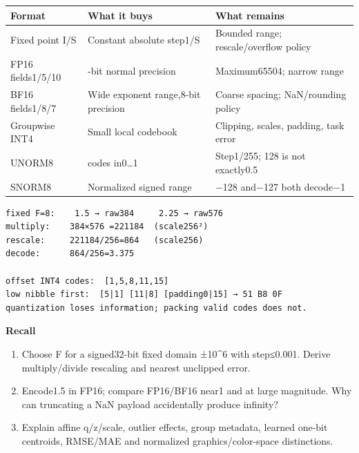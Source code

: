 {\def\LTcaptype{none} %
\begin{longtable}[]{@{}
  >{\raggedright\arraybackslash}p{}
  >{\raggedright\arraybackslash}p{}
  >{\raggedright\arraybackslash}p{}@{}}
\toprule\noalign{}
\begin{minipage}[b]{\linewidth}\raggedright
Format
\end{minipage} & \begin{minipage}[b]{\linewidth}\raggedright
What it buys
\end{minipage} & \begin{minipage}[b]{\linewidth}\raggedright
What remains
\end{minipage} \\
\midrule\noalign{}
\endhead
\bottomrule\noalign{}
\endlastfoot
Fixed point I/S & Constant absolute step1/S & Bounded range; rescale/overflow policy \\
FP16 fields1/5/10 & 11-bit normal precision & Maximum65504; narrow range \\
BF16 fields1/8/7 & Wide exponent range,8-bit precision & Coarse spacing; NaN/rounding policy \\
Groupwise INT4 & Small local codebook & Clipping, scales, padding, task error \\
UNORM8 & 256 codes in0\ldots1 & Step1/255; 128 is not exactly0.5 \\
SNORM8 & Normalized signed range & −128 and−127 both decode−1 \\
\end{longtable}
}

\begin{verbatim}
fixed F=8:    1.5 → raw384     2.25 → raw576
multiply:    384×576 =221184  (scale256²)
rescale:     221184/256=864   (scale256)
decode:      864/256=3.375

offset INT4 codes:  [1,5,8,11,15]
low nibble first:  [5|1] [11|8] [padding0|15] → 51 B8 0F
quantization loses information; packing valid codes does not.
\end{verbatim}

\textbf{Recall}

\begin{enumerate}
\def\labelenumi{\arabic{enumi}.}
\setcounter{enumi}{17}
\tightlist
\item
  Choose F for a signed32-bit fixed domain ±10\^{}6 with step≤0.001. Derive multiply/divide rescaling and nearest unclipped error.
\item
  Encode1.5 in FP16; compare FP16/BF16 near1 and at large magnitude. Why can truncating a NaN payload accidentally produce infinity?
\item
  Explain affine q/z/scale, outlier effects, group metadata, learned one-bit centroids, RMSE/MAE and normalized graphics/color-space distinctions.
\end{enumerate}

